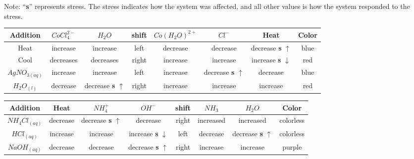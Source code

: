 \documentclass[12pt]{article}
\begin{document}
\fontsize{9pt}{12pt}
Note: ``\textbf s'' represents stress. The stress indicates how the system was affected, and all other values is how the system responded to the stress.
\fontsize{12pt}{12pt}


\begin{center}
\end{center}
\begin{adjustbox}{max width=50in,center}
  \begin{tabular}{|c|c|c|c|c|c|c|c| } 
    \hline
    Addition&$CoCl_4^{2-}$&$H_2O$&shift&$Co(H_2O)^{2+}$&$Cl^{-}$&Heat&Color \\
    \hline
    Heat&increase&increase&left&decrease&decrease&decrease \textbf s $\uparrow$&blue\\
    \hline
    Cool&decreases&decreases&right&increase&increase&increase \textbf s $\downarrow$&red\\
    \hline
    $AgNO_{3(aq)}$&increase&increase&left&increase &decrease \textbf s $\uparrow$ & decrease& blue\\
    \hline
    $H_2O_{(l)}$&decrease&decrease \textbf s $\uparrow$ & right& increase& increase & increase& red\\
    \hline
  \end{tabular}
\end{adjustbox}
\vspace{0cm}

\begin{center}
\end{center}
\begin{adjustbox}{max width=50in,center}
  \begin{tabular}{|c|c|c|c|c|c|c|c|}
    \hline
    Addition&Heat&$NH_4^{+}$&$OH^{-}$&shift&$NH_3$&$H_2O$&Color\\
    \hline
    $NH_4Cl_{(aq)}$&decrease&decrease \textbf s $\uparrow$& decrease& right & increased& increased& colorless\\
    \hline
    $HCl_{(aq)}$&increase&increase&increase \textbf s $\downarrow$& left& decrease & decrease \textbf s $\uparrow$ & colorless\\ 
    \hline
    $NaOH_{(aq)}$&decrease&decrease&decrease \textbf s $\uparrow$ & right&increase&increase&purple\\
    \hline
  \end{tabular}
\end{adjustbox}
\end{document}
